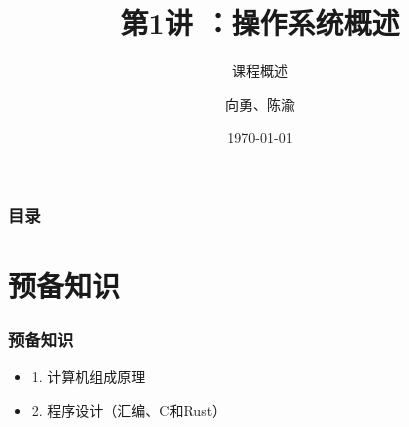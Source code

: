 \documentclass[UTF8]{ctexbeamer}
\begin{document}
\title{第1讲 ：操作系统概述}

\subtitle{课程概述}

\author{\songti 向勇、陈渝}


\date{\today}

\frame{\titlepage}

\begin{frame}

\frametitle{目录}

\tableofcontents

\end{frame}

\section{预备知识}





\begin{frame}

\frametitle{预备知识}

\begin{itemize}

\item 1. 计算机组成原理

\item 2. 程序设计（汇编、C和Rust）
\end{itemize}

\end{frame}
\end{document}
